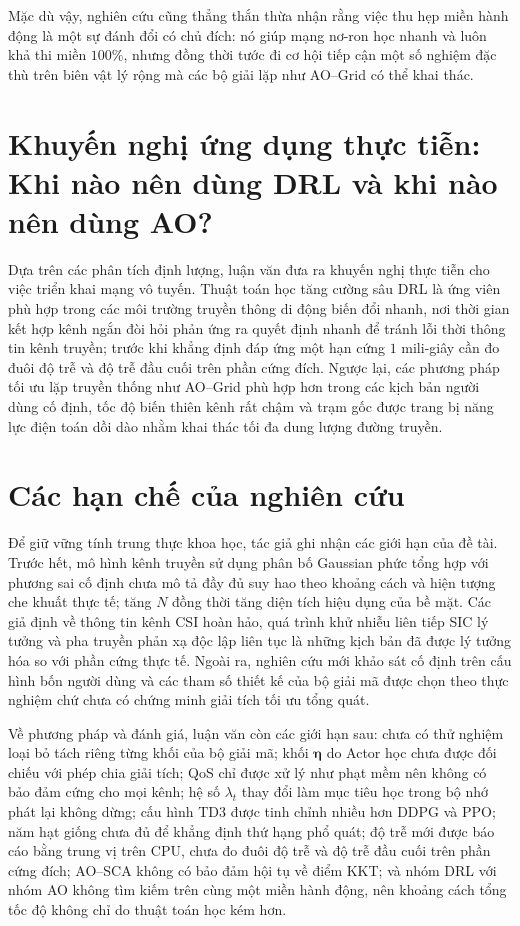 Mặc dù vậy, nghiên cứu cũng thẳng thắn thừa nhận rằng việc thu hẹp miền hành động là một sự đánh đổi có chủ đích: nó
giúp mạng nơ-ron học nhanh và luôn khả thi miền $100\%$, nhưng đồng thời tước đi cơ hội tiếp cận một số nghiệm đặc
thù trên biên vật lý rộng mà các bộ giải lặp như AO--Grid có thể khai thác.

\section{Khuyến nghị ứng dụng thực tiễn: Khi nào nên dùng DRL và khi nào nên dùng AO?}
\label{sec:khi-nao-dung}

Dựa trên các phân tích định lượng, luận văn đưa ra khuyến nghị thực tiễn cho việc triển khai mạng vô tuyến. Thuật
toán học tăng cường sâu DRL là ứng viên phù hợp trong các môi trường truyền thông di động biến đổi nhanh, nơi thời
gian kết hợp kênh ngắn đòi hỏi phản ứng ra quyết định nhanh để tránh lỗi thời thông tin kênh truyền; trước khi khẳng
định đáp ứng một hạn cứng $1$ mili-giây cần đo đuôi độ trễ và độ trễ đầu cuối trên phần cứng đích. Ngược lại, các
phương pháp tối ưu lặp truyền thống như AO--Grid phù hợp hơn trong các kịch bản người dùng cố định, tốc độ biến thiên
kênh rất chậm và trạm gốc được trang bị năng lực điện toán dồi dào nhằm khai thác tối đa dung lượng đường truyền.

\section{Các hạn chế của nghiên cứu}
\label{sec:han-che}

Để giữ vững tính trung thực khoa học, tác giả ghi nhận các giới hạn của đề tài. Trước hết, mô hình kênh truyền sử
dụng phân bố Gaussian phức tổng hợp với phương sai cố định chưa mô tả đầy đủ suy hao theo khoảng cách và hiện tượng
che khuất thực tế; tăng $N$ đồng thời tăng diện tích hiệu dụng của bề mặt. Các giả định về thông tin kênh CSI hoàn
hảo, quá trình khử nhiễu liên tiếp SIC lý tưởng và pha truyền phản xạ độc lập liên tục là những kịch bản đã được lý
tưởng hóa so với phần cứng thực tế. Ngoài ra, nghiên cứu mới khảo sát cố định trên cấu hình bốn người dùng và các
tham số thiết kế của bộ giải mã được chọn theo thực nghiệm chứ chưa có chứng minh giải tích tối ưu tổng quát.

Về phương pháp và đánh giá, luận văn còn các giới hạn sau: chưa có thử nghiệm loại bỏ tách riêng từng khối của bộ
giải mã; khối $\boldsymbol{\eta}$ do Actor học chưa được đối chiếu với phép chia giải tích; QoS chỉ được xử lý như
phạt mềm nên không có bảo đảm cứng cho mọi kênh; hệ số $\lambda_t$ thay đổi làm mục tiêu học trong bộ nhớ phát lại
không dừng; cấu hình TD3 được tinh chỉnh nhiều hơn DDPG và PPO; năm hạt giống chưa đủ để khẳng định thứ hạng phổ
quát; độ trễ mới được báo cáo bằng trung vị trên CPU, chưa đo đuôi độ trễ và độ trễ đầu cuối trên phần cứng đích;
AO--SCA không có bảo đảm hội tụ về điểm KKT; và nhóm DRL với nhóm AO không tìm kiếm trên cùng một miền hành động,
nên khoảng cách tổng tốc độ không chỉ do thuật toán học kém hơn.

